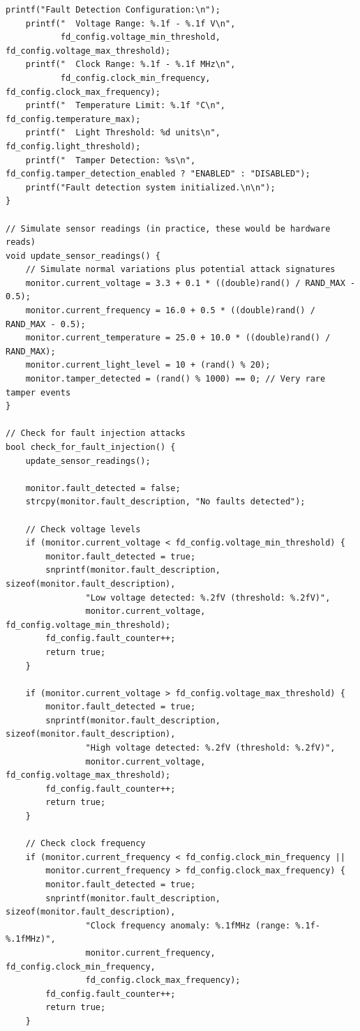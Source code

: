 \documentclass[12pt,a4paper]{article}
\begin{document}
\begin{lstlisting}[caption={Hardware Fault Detection System}]
    printf("Fault Detection Configuration:\n");
    printf("  Voltage Range: %.1f - %.1f V\n", 
           fd_config.voltage_min_threshold, fd_config.voltage_max_threshold);
    printf("  Clock Range: %.1f - %.1f MHz\n",
           fd_config.clock_min_frequency, fd_config.clock_max_frequency);
    printf("  Temperature Limit: %.1f °C\n", fd_config.temperature_max);
    printf("  Light Threshold: %d units\n", fd_config.light_threshold);
    printf("  Tamper Detection: %s\n", fd_config.tamper_detection_enabled ? "ENABLED" : "DISABLED");
    printf("Fault detection system initialized.\n\n");
}

// Simulate sensor readings (in practice, these would be hardware reads)
void update_sensor_readings() {
    // Simulate normal variations plus potential attack signatures
    monitor.current_voltage = 3.3 + 0.1 * ((double)rand() / RAND_MAX - 0.5);
    monitor.current_frequency = 16.0 + 0.5 * ((double)rand() / RAND_MAX - 0.5);
    monitor.current_temperature = 25.0 + 10.0 * ((double)rand() / RAND_MAX);
    monitor.current_light_level = 10 + (rand() % 20);
    monitor.tamper_detected = (rand() % 1000) == 0; // Very rare tamper events
}

// Check for fault injection attacks
bool check_for_fault_injection() {
    update_sensor_readings();
    
    monitor.fault_detected = false;
    strcpy(monitor.fault_description, "No faults detected");
    
    // Check voltage levels
    if (monitor.current_voltage < fd_config.voltage_min_threshold) {
        monitor.fault_detected = true;
        snprintf(monitor.fault_description, sizeof(monitor.fault_description),
                "Low voltage detected: %.2fV (threshold: %.2fV)",
                monitor.current_voltage, fd_config.voltage_min_threshold);
        fd_config.fault_counter++;
        return true;
    }
    
    if (monitor.current_voltage > fd_config.voltage_max_threshold) {
        monitor.fault_detected = true;
        snprintf(monitor.fault_description, sizeof(monitor.fault_description),
                "High voltage detected: %.2fV (threshold: %.2fV)", 
                monitor.current_voltage, fd_config.voltage_max_threshold);
        fd_config.fault_counter++;
        return true;
    }
    
    // Check clock frequency
    if (monitor.current_frequency < fd_config.clock_min_frequency ||
        monitor.current_frequency > fd_config.clock_max_frequency) {
        monitor.fault_detected = true;
        snprintf(monitor.fault_description, sizeof(monitor.fault_description),
                "Clock frequency anomaly: %.1fMHz (range: %.1f-%.1fMHz)",
                monitor.current_frequency, fd_config.clock_min_frequency, 
                fd_config.clock_max_frequency);
        fd_config.fault_counter++;
        return true;
    }
    

\end{lstlisting}
\end{document}
